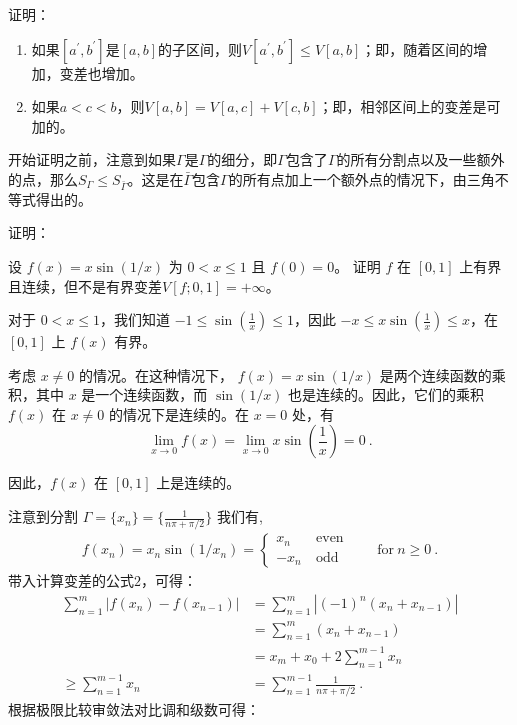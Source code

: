 \begin{example}{证明：}

\end{example}
\begin{theorem}{}
\begin{enumerate}
\item 如果$[a^{\prime},b^{\prime}]$是$[a,b]$的子区间，则$V[a^{\prime},b^{\prime}]\leq V[a,b]$；即，随着区间的增加，变差也增加。
\item 如果$a<c<b$，则$V[a,b]=V[a,c]+V[c,b]$；即，相邻区间上的变差是可加的。
\end{enumerate}
\end{theorem}
开始证明之前，注意到如果$\Gamma$是$\Gamma$的细分，即$\Gamma$包含了$\Gamma$的所有分割点以及一些额外的点，那么$S_{\Gamma}\leq S_{\bar{\Gamma}}$。这是在$\bar{\Gamma}$包含$\Gamma$的所有点加上一个额外点的情况下，由三角不等式得出的。

\begin{example}{证明：}

\end{example}

\begin{example}{设 $f(x)=x\sin\left(1/x\right)$ 为 $0<x\leq1$ 且 $f(0)=0$。 证明 $f$ 在 $[0,1]$ 上有界且连续，但不是有界变差$V[f;0,1]=+\infty$。}

对于 $0 < x \leq 1$，我们知道 $-1 \leq \sin\left(\frac{1}{x}\right) \leq 1$，因此 $-x \leq x\sin\left(\frac{1}{x}\right) \leq x$，在 $[0,1]$ 上 $f(x)$ 有界。

考虑 $x \neq 0$ 的情况。在这种情况下， $f(x) = x \sin(1/x)$ 是两个连续函数的乘积，其中 $x$ 是一个连续函数，而 $\sin(1/x)$ 也是连续的。因此，它们的乘积 $f(x)$ 在 $x \neq 0$ 的情况下是连续的。在 $x = 0$ 处，有
\begin{equation}
\lim_{{x \to 0}} f(x) = \lim_{{x \to 0}} x \sin\left(\frac{1}{x}\right) = 0~.
\end{equation}

因此，$f(x)$ 在 $[0,1]$ 上是连续的。

注意到分割 $\Gamma = \{x_n\}=\{\frac{1}{n\pi+\pi/2}\}$ 我们有,  
\begin{align} f(x_n)=x_n\sin(1/x_n)=\left\{\begin{matrix}x_n& \ \text{even}\\ -x_n& \ \text{odd}\end{matrix}\right.\qquad\text{for}\ n\geq0 ~.
\end{align}
带入计算变差的公式$2$，可得：
\begin{align}
\sum_{n=1}^m|f(x_n)-f(x_{n-1})|&=\sum_{n=1}^m|(-1)^n(x_n+x_{n-1})|\\
&= \sum_{n=1}^m(x_n+x_{n-1})\\&=x_m+x_0+2\sum_{n=1}^{m-1}x_n\\\geq \sum_{n=1}^{m-1} x_n&=\sum_{n=1}^{m-1} \frac{1}{n\pi+\pi/2}~.
\end{align}
根据极限比较审敛法对比调和级数可得：

\end{example}

